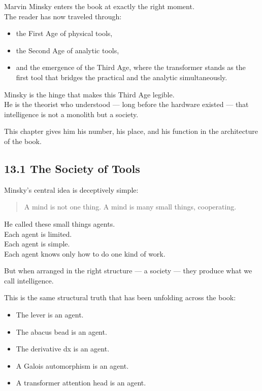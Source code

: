 \documentclass[
]{article}
\providecommand{\tightlist}{%
  \setlength{\itemsep}{0pt}\setlength{\parskip}{0pt}}
\begin{document}
Marvin Minsky enters the book at exactly the right moment.\\
The reader has now traveled through:

\begin{itemize}
\tightlist
\item
  the First Age of physical tools,
\item
  the Second Age of analytic tools,
\item
  and the emergence of the Third Age, where the transformer stands as
  the first tool that bridges the practical and the analytic
  simultaneously.
\end{itemize}

Minsky is the hinge that makes this Third Age legible.\\
He is the theorist who understood --- long before the hardware existed
--- that intelligence is not a monolith but a society.

This chapter gives him his number, his place, and his function in the
architecture of the book.

\hypertarget{the-society-of-tools}{%
\subsection{13.1 The Society of Tools}\label{the-society-of-tools}}

Minsky's central idea is deceptively simple:

\begin{quote}
A mind is not one thing. A mind is many small things, cooperating.
\end{quote}

He called these small things agents.\\
Each agent is limited.\\
Each agent is simple.\\
Each agent knows only how to do one kind of work.

But when arranged in the right structure --- a society --- they produce
what we call intelligence.

This is the same structural truth that has been unfolding across the
book:

\begin{itemize}
\tightlist
\item
  The lever is an agent.
\item
  The abacus bead is an agent.
\item
  The derivative dx is an agent.
\item
  A Galois automorphism is an agent.
\item
  A transformer attention head is an agent.
\end{itemize}
\end{document}
